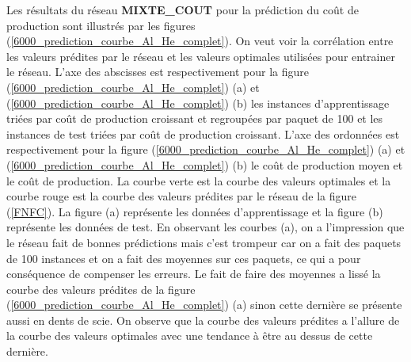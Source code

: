 Les résultats du réseau \textbf{MIXTE\_COUT} pour la prédiction du coût de production sont illustrés par les figures  (\ref{6000_prediction_courbe_Al_He_complet}). On veut voir la corrélation entre les valeurs prédites par le réseau et les valeurs optimales  utilisées pour entrainer le réseau. L'axe des abscisses est respectivement pour la figure (\ref{6000_prediction_courbe_Al_He_complet}) (a) et (\ref{6000_prediction_courbe_Al_He_complet}) (b) les instances d'apprentissage triées par coût de production croissant et regroupées par paquet de 100 et les instances de test triées par coût de production croissant. L'axe des ordonnées est respectivement pour la figure (\ref{6000_prediction_courbe_Al_He_complet}) (a) et (\ref{6000_prediction_courbe_Al_He_complet}) (b) le coût de production moyen et le coût de production. La courbe verte est la courbe des valeurs optimales et la courbe rouge est la courbe des valeurs prédites par le réseau de la figure (\ref{FNFC}). La figure (a) représente les données d'apprentissage et la figure (b) représente les données de test. En observant les courbes (a), on a l'impression que le réseau fait de bonnes prédictions mais c'est trompeur car on a fait des paquets de 100 instances et on a fait des moyennes sur ces paquets, ce qui a pour conséquence de compenser les erreurs. Le fait de faire des moyennes a lissé la courbe des valeurs prédites de la figure (\ref{6000_prediction_courbe_Al_He_complet}) (a) sinon cette dernière se présente aussi en dents de scie. On observe que la courbe des valeurs prédites a l'allure de la courbe des valeurs optimales avec une tendance à être au dessus de cette dernière.




%
%

